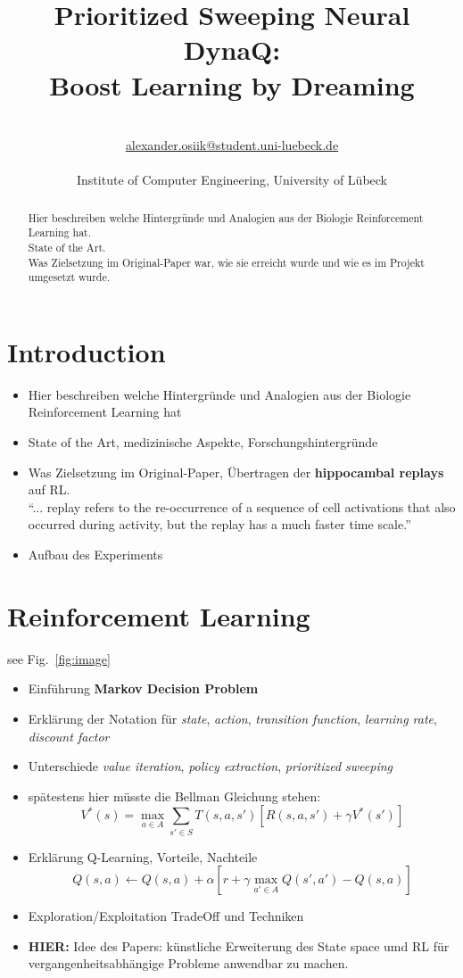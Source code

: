 \documentclass[a4paper]{article}
\title{\textbf{Prioritized Sweeping Neural DynaQ:\\ Boost Learning by Dreaming}}\let\Title\@title
\author{\AuthorName\\
	\href{mailto:alexander.osiik@student.uni-luebeck.de}{alexander.osiik@student.uni-luebeck.de}\\
	\small \seminar\\
	\small Institute of Computer Engineering, University of L\"ubeck\\
}\let\Author\@author
\begin{document}
	\maketitle
	
	\begin{abstract}
		\noindent%
		Hier beschreiben welche Hintergründe und Analogien aus der Biologie Reinforcement Learning hat.\\
		State of the Art.\\
		Was Zielsetzung im Original-Paper war, wie sie erreicht wurde und wie es im Projekt umgesetzt wurde.
	\end{abstract}
	
	
	\section{Introduction}
	\label{sec:introduction}
	\begin{itemize}
		\item Hier beschreiben welche Hintergründe und Analogien aus der Biologie Reinforcement Learning hat
		\item State of the Art, medizinische Aspekte, Forschungshintergründe
		\item Was Zielsetzung im Original-Paper, Übertragen der \textbf{hippocambal replays} auf RL.\\
		``... replay refers to the re-occurrence of a sequence of cell activations that also occurred during activity, but the replay has a much faster time scale.''
		\item Aufbau des Experiments
	\end{itemize}

	\section{Reinforcement Learning}
	\label{sec:rl}
	see Fig.~\ref{fig:image}	
	\begin{itemize}
		\item Einführung \textbf{Markov Decision Problem}
		\item Erklärung der Notation für \textit{state}, \textit{action}, \textit{transition function}, \textit{learning rate}, \textit{discount factor}
		\item Unterschiede \textit{value iteration}, \textit{policy extraction}, \textit{prioritized sweeping}
		\item spätestens hier müsste die Bellman Gleichung stehen:
		$$V^*(s) = \max_{a \in A} \sum_{s' \in S}^{} T(s,a,s')[R(s,a,s')+\gamma V^*(s')]$$
		\item Erklärung Q-Learning, Vorteile, Nachteile
		$$Q(s,a) \leftarrow Q(s,a) + \alpha[r + \gamma \max_{a' \in A}Q(s',a')-Q(s,a)]$$
		\item Exploration/Exploitation TradeOff und Techniken
		\item \textbf{HIER:} Idee des Papers: künstliche Erweiterung des State space umd RL für vergangenheitsabhängige Probleme anwendbar zu machen.
	\end{itemize}
	
\end{document}
